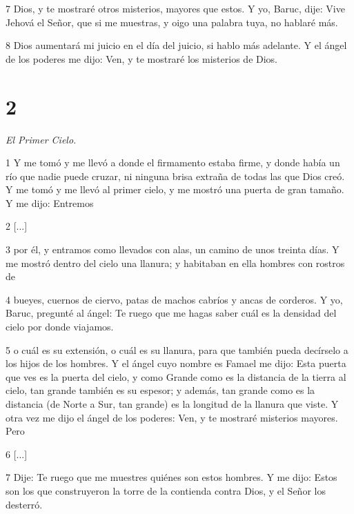 \par 7 Dios, y te mostraré otros misterios, mayores que estos. Y yo, Baruc, dije: Vive Jehová el Señor, que si me muestras, y oigo una palabra tuya, no hablaré más.

\par 8 Dios aumentará mi juicio en el día del juicio, si hablo más adelante. Y el ángel de los poderes me dijo: Ven, y te mostraré los misterios de Dios.

\chapter{2}

\par \textit{El Primer Cielo.}

\par 1 Y me tomó y me llevó a donde el firmamento estaba firme, y donde había un río que nadie puede cruzar, ni ninguna brisa extraña de todas las que Dios creó. Y me tomó y me llevó al primer cielo, y me mostró una puerta de gran tamaño. Y me dijo: Entremos

\par 2 [...]

\par 3 por él, y entramos como llevados con alas, un camino de unos treinta días. Y me mostró dentro del cielo una llanura; y habitaban en ella hombres con rostros de

\par 4 bueyes, cuernos de ciervo, patas de machos cabríos y ancas de corderos. Y yo, Baruc, pregunté al ángel: Te ruego que me hagas saber cuál es la densidad del cielo por donde viajamos.

\par 5 o cuál es su extensión, o cuál es su llanura, para que también pueda decírselo a los hijos de los hombres. Y el ángel cuyo nombre es Famael me dijo: Esta puerta que ves es la puerta del cielo, y como Grande como es la distancia de la tierra al cielo, tan grande también es su espesor; y además, tan grande como es la distancia (de Norte a Sur, tan grande) es la longitud de la llanura que viste. Y otra vez me dijo el ángel de los poderes: Ven, y te mostraré misterios mayores. Pero

\par 6 [...]

\par 7 Dije: Te ruego que me muestres quiénes son estos hombres. Y me dijo: Estos son los que construyeron la torre de la contienda contra Dios, y el Señor los desterró.


